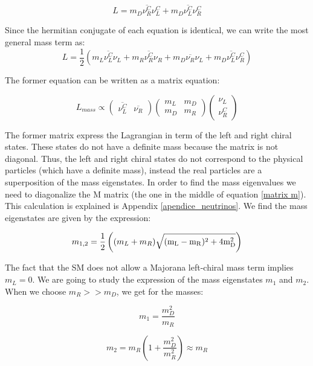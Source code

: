 \begin{equation}\label{Dirac conjugated}
L = m_D \overline{\nu_R^C} \nu_L^C + m_D \overline{\nu_L^C}\nu_R^C
\end{equation} 

Since the hermitian conjugate of each equation is identical, we can write the most general mass term as:
\begin{equation}
L = \frac{1}{2} \left( m_L \overline{\nu_L^C} \nu_L + m_R \overline{\nu_R^C} \nu_{R} + m_D \overline{\nu_R}\nu_L + m_D \overline{\nu_L^C}\nu_R^C   \right)
\end{equation}

The former equation can be written as a matrix equation: 

\begin{equation}\label{matrix m}
L_{mass} \propto
\begin{pmatrix} 
  \overline{\nu_L^C} & \overline{\nu_R}
\end{pmatrix}
\begin{pmatrix}
  m_L & m_D \\
  m_D & m_R  
\end{pmatrix}
\begin{pmatrix}
  \nu_L \\
  \nu_R^C  
\end{pmatrix}
\end{equation}

The former matrix express the Lagrangian in term of the left and right chiral states. These states do not have a definite mass because the matrix is not diagonal. Thus, the left and right chiral states do not correspond to the physical particles (which have a definite mass), instead the real particles are a superposition of the mass eigenstates. In order to find the mass eigenvalues we need to diagonalize the M matrix (the one in the middle of equation \ref{matrix m}). This calculation is explained is Appendix \ref{apendice_neutrinos}. We find the mass eigenstates are given by the expression:

\begin{equation}
m_{1,2} = \frac{1}{2} \left( (m_L + m_R) \rm \sqrt{(m_L - m_R)^2 + 4m_D^2} \right)
\end{equation}
 
The fact that the SM does not allow a Majorana left-chiral mass term implies $m_L = 0$. We are going to study the expression of the mass eigenstates $m_1$ and $m_2$. When we choose $m_R >> m_D$, we get for the masses:

\begin{equation}
m_1 = \frac{m_D^2}{m_R}
\end{equation}

\begin{equation}
m_2 = m_R \left( 1 + \frac{m_D^2}{m_R^2}\right) \approx m_R 
\end{equation}
 
 
 
 
 
 
 
 
 